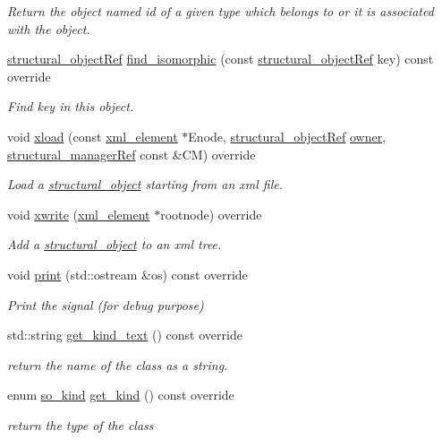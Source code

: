 \begin{DoxyCompactItemize}
\begin{DoxyCompactList}\small\item\em Return the object named id of a given type which belongs to or it is associated with the object. \end{DoxyCompactList}\item 
\hyperlink{structural__objects_8hpp_a8ea5f8cc50ab8f4c31e2751074ff60b2}{structural\+\_\+object\+Ref} \hyperlink{classsignal__o_a3c49fe1a0774acfff45b3a899a852a36}{find\+\_\+isomorphic} (const \hyperlink{structural__objects_8hpp_a8ea5f8cc50ab8f4c31e2751074ff60b2}{structural\+\_\+object\+Ref} key) const override
\begin{DoxyCompactList}\small\item\em Find key in this object. \end{DoxyCompactList}\item 
void \hyperlink{classsignal__o_af1096352917fd77b01263f101c5f9465}{xload} (const \hyperlink{classxml__element}{xml\+\_\+element} $\ast$Enode, \hyperlink{structural__objects_8hpp_a8ea5f8cc50ab8f4c31e2751074ff60b2}{structural\+\_\+object\+Ref} \hyperlink{classstructural__object_a3e96b3e00b8a78adfc44872d82e186ea}{owner}, \hyperlink{structural__manager_8hpp_ab3136f0e785d8535f8d252a7b53db5b5}{structural\+\_\+manager\+Ref} const \&CM) override
\begin{DoxyCompactList}\small\item\em Load a \hyperlink{classstructural__object}{structural\+\_\+object} starting from an xml file. \end{DoxyCompactList}\item 
void \hyperlink{classsignal__o_af828ace28e381c16a88a79b330e2e5b2}{xwrite} (\hyperlink{classxml__element}{xml\+\_\+element} $\ast$rootnode) override
\begin{DoxyCompactList}\small\item\em Add a \hyperlink{classstructural__object}{structural\+\_\+object} to an xml tree. \end{DoxyCompactList}\item 
void \hyperlink{classsignal__o_a97cec23d951b1b816b4a76a3a07a1490}{print} (std\+::ostream \&os) const override
\begin{DoxyCompactList}\small\item\em Print the signal (for debug purpose) \end{DoxyCompactList}\item 
std\+::string \hyperlink{classsignal__o_a66d4342659804e8d1ed84d471313fc68}{get\+\_\+kind\+\_\+text} () const override
\begin{DoxyCompactList}\small\item\em return the name of the class as a string. \end{DoxyCompactList}\item 
enum \hyperlink{structural__objects_8hpp_acf52399aecacb7952e414c5746ce6439}{so\+\_\+kind} \hyperlink{classsignal__o_a4407c1e66d004e623ccdc8b57d5fb385}{get\+\_\+kind} () const override
\begin{DoxyCompactList}\small\item\em return the type of the class \end{DoxyCompactList}\end{DoxyCompactItemize}
